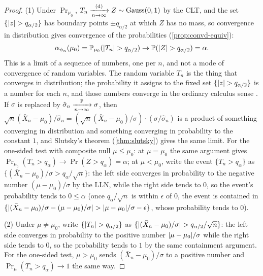 \begin{proof}
(1) Under $\Pr_{\mu_0}$, $T_n \xrightarrow [n \to \infty ]{\text{(d)}} Z \sim \text{Gauss}(0,1)$ by the CLT, and the set $\{\lvert z\rvert > q_{\alpha/2}\}$ has boundary points $\pm q_{\alpha/2}$ at which $Z$ has no mass, so convergence in distribution gives convergence of the probabilities (\cref{prop:convd-equiv}):
\[
\alpha_{\psi_n}(\mu_0) = \mathbb{P}_{\mu_0}(\lvert T_n\rvert > q_{\alpha/2}) \to \mathbb{P}(\lvert Z\rvert > q_{\alpha/2}) = \alpha.
\]
This is a limit of a sequence of numbers, one per $n$, and not a mode of convergence of random variables.
The random variable $T_n$ is the thing that converges in distribution; the probability it assigns to the fixed set $\{\lvert z\rvert > q_{\alpha/2}\}$ is a number for each $n$, and those numbers converge in the ordinary calculus sense .
If $\sigma$ is replaced by $\hat{\sigma}_n \xrightarrow [n \to \infty ]{\mathbb{P}} \sigma$, then $\sqrt{n}(\bar{X}_n - \mu_0)/\hat{\sigma}_n = \left(\sqrt{n}(\bar{X}_n - \mu_0)/\sigma\right)\cdot(\sigma/\hat{\sigma}_n)$ is a product of something converging in distribution and something converging in probability to the constant $1$, and Slutsky's theorem (\cref{thm:slutsky}) gives the same limit.
For the one-sided test with composite null $\mu \leq \mu_0$: at $\mu = \mu_0$ the same argument gives $\Pr_{\mu_0}(T_n > q_\alpha) \to \Pr(Z > q_\alpha) = \alpha$; at $\mu < \mu_0$, write the event $\{T_n > q_\alpha\}$ as $\{(\bar{X}_n - \mu_0)/\sigma > q_\alpha/\sqrt{n}\}$: the left side converges in probability to the negative number $(\mu - \mu_0)/\sigma$ by the LLN, while the right side tends to $0$, so the event's probability tends to $0 \leq \alpha$ (once $q_\alpha/\sqrt{n}$ is within $\epsilon$ of $0$, the event is contained in $\{\lvert(\bar{X}_n - \mu_0)/\sigma - (\mu - \mu_0)/\sigma\rvert > \lvert\mu - \mu_0\rvert/\sigma - \epsilon\}$, whose probability tends to $0$).

(2) Under $\mu \neq \mu_0$, write $\{\lvert T_n\rvert > q_{\alpha/2}\}$ as $\{\lvert(\bar{X}_n - \mu_0)/\sigma\rvert > q_{\alpha/2}/\sqrt{n}\}$: the left side converges in probability to the positive number $\lvert\mu - \mu_0\rvert/\sigma$ while the right side tends to $0$, so the probability tends to $1$ by the same containment argument.
For the one-sided test, $\mu > \mu_0$ sends $(\bar{X}_n - \mu_0)/\sigma$ to a positive number and $\Pr_\mu(T_n > q_\alpha) \to 1$ the same way.
\end{proof}

